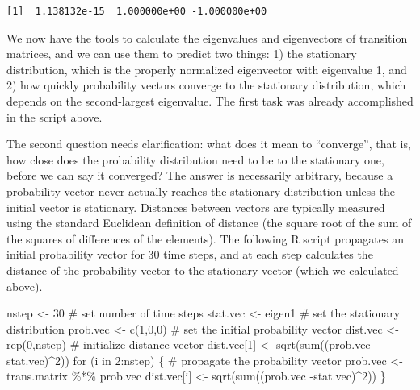 \documentclass[
  letterpaper,
  DIV=11,
  numbers=noendperiod]{scrreprt}
\newenvironment{Shaded}{\begin{snugshade}}{\end{snugshade}}
\newcommand{\CommentTok}[1]{\textcolor[rgb]{0.37,0.37,0.37}{#1}}
\newcommand{\ControlFlowTok}[1]{\textcolor[rgb]{0.00,0.23,0.31}{#1}}
\newcommand{\DecValTok}[1]{\textcolor[rgb]{0.68,0.00,0.00}{#1}}
\newcommand{\FunctionTok}[1]{\textcolor[rgb]{0.28,0.35,0.67}{#1}}
\newcommand{\NormalTok}[1]{\textcolor[rgb]{0.00,0.23,0.31}{#1}}
\newcommand{\OtherTok}[1]{\textcolor[rgb]{0.00,0.23,0.31}{#1}}
\newcommand{\SpecialCharTok}[1]{\textcolor[rgb]{0.37,0.37,0.37}{#1}}
\begin{document}
\begin{verbatim}
[1]  1.138132e-15  1.000000e+00 -1.000000e+00
\end{verbatim}

We now have the tools to calculate the eigenvalues and eigenvectors of
transition matrices, and we can use them to predict two things: 1) the
stationary distribution, which is the properly normalized eigenvector
with eigenvalue 1, and 2) how quickly probability vectors converge to
the stationary distribution, which depends on the second-largest
eigenvalue. The first task was already accomplished in the script above.

The second question needs clarification: what does it mean to
``converge'', that is, how close does the probability distribution need
to be to the stationary one, before we can say it converged? The answer
is necessarily arbitrary, because a probability vector never actually
reaches the stationary distribution unless the initial vector is
stationary. Distances between vectors are typically measured using the
standard Euclidean definition of distance (the square root of the sum of
the squares of differences of the elements). The following R script
propagates an initial probability vector for 30 time steps, and at each
step calculates the distance of the probability vector to the stationary
vector (which we calculated above).

\begin{Shaded}
\begin{Highlighting}[]
\NormalTok{nstep }\OtherTok{\textless{}{-}} \DecValTok{30} \CommentTok{\# set number of time steps}
\NormalTok{stat.vec }\OtherTok{\textless{}{-}}\NormalTok{ eigen1 }\CommentTok{\# set the stationary distribution}
\NormalTok{prob.vec }\OtherTok{\textless{}{-}} \FunctionTok{c}\NormalTok{(}\DecValTok{1}\NormalTok{,}\DecValTok{0}\NormalTok{,}\DecValTok{0}\NormalTok{) }
\CommentTok{\# set the initial probability vector}
\NormalTok{dist.vec }\OtherTok{\textless{}{-}} \FunctionTok{rep}\NormalTok{(}\DecValTok{0}\NormalTok{,nstep) }\CommentTok{\# initialize distance vector}
\NormalTok{dist.vec[}\DecValTok{1}\NormalTok{] }\OtherTok{\textless{}{-}} \FunctionTok{sqrt}\NormalTok{(}\FunctionTok{sum}\NormalTok{((prob.vec }\SpecialCharTok{{-}}\NormalTok{stat.vec)}\SpecialCharTok{\^{}}\DecValTok{2}\NormalTok{))}
\ControlFlowTok{for}\NormalTok{ (i }\ControlFlowTok{in} \DecValTok{2}\SpecialCharTok{:}\NormalTok{nstep) \{ }
  \CommentTok{\# propagate the probability vector}
\NormalTok{  prob.vec }\OtherTok{\textless{}{-}}\NormalTok{ trans.matrix }\SpecialCharTok{\%*\%}\NormalTok{ prob.vec}
\NormalTok{  dist.vec[i] }\OtherTok{\textless{}{-}} \FunctionTok{sqrt}\NormalTok{(}\FunctionTok{sum}\NormalTok{((prob.vec }\SpecialCharTok{{-}}\NormalTok{stat.vec)}\SpecialCharTok{\^{}}\DecValTok{2}\NormalTok{))}
\NormalTok{\}}
\end{Highlighting}
\end{Shaded}
\end{document}
